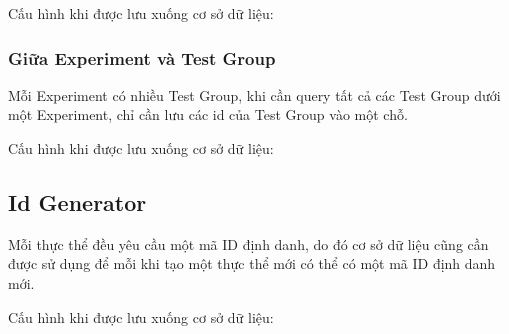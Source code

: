 Cấu hình khi được lưu xuống cơ sở dữ liệu:

\begin{itemize}
\end{itemize}

\subsubsection{Giữa Experiment và Test Group}

Mỗi Experiment có nhiều Test Group, khi cần query tất cả các Test Group dưới một Experiment, chỉ cần lưu
các id của Test Group vào một chỗ.

Cấu hình khi được lưu xuống cơ sở dữ liệu:

\begin{itemize}
\end{itemize}

\subsection{Id Generator}

Mỗi thực thể đều yêu cầu một mã ID định danh, do đó cơ sở dữ liệu cũng cần được sử dụng để mỗi
khi tạo một thực thể mới có thể có một mã ID định danh mới.

Cấu hình khi được lưu xuống cơ sở dữ liệu:

\begin{itemize}
\end{itemize}
